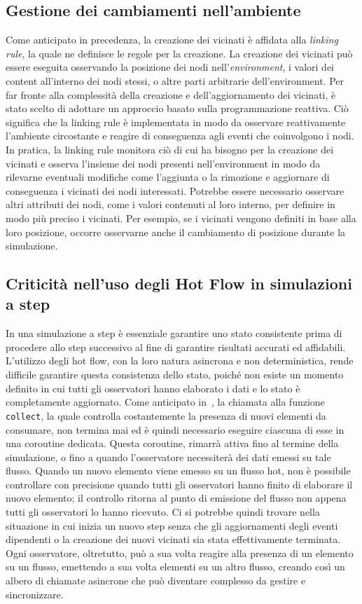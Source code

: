 \documentclass[12pt,a4paper,openright,twoside]{book}
\begin{document}
\subsection{Gestione dei cambiamenti nell'ambiente}
\label{sec:linking-rule}
Come anticipato in precedenza, la creazione dei vicinati è affidata alla \textit{linking rule}, la quale ne definisce le regole per la creazione. La creazione dei vicinati può essere eseguita osservando la posizione dei nodi nell'\textit{environment}, i valori dei content all'interno dei nodi stessi, o altre parti arbitrarie dell'environment. 
Per far fronte alla complessità della creazione e dell'aggiornamento dei vicinati, è stato scelto di adottare un approccio basato sulla programmazione reattiva. Ciò significa che la linking rule è implementata in modo da osservare reattivamente l'ambiente circostante e reagire di conseguenza agli eventi che coinvolgono i nodi.
In pratica, la linking rule monitora ciò di cui ha bisogno per la creazione dei vicinati e osserva l'insieme dei nodi presenti nell'environment in modo da rilevarne eventuali modifiche come l'aggiunta o la rimozione e aggiornare di conseguenza i vicinati dei nodi interessati. Potrebbe essere necessario osservare altri attributi dei nodi, come i valori contenuti al loro interno, per definire in modo più preciso i vicinati.
Per esempio, se i vicinati vengono definiti in base alla loro posizione, occorre osservarne anche il cambiamento di posizione durante la simulazione.

\subsection{Criticità nell'uso degli Hot Flow in simulazioni a step}
\label{sec:criticità-hot-flow}
In una simulazione a step è essenziale garantire uno stato consistente prima di procedere allo step successivo al fine di garantire risultati accurati ed affidabili. 
L'utilizzo degli hot flow, con la loro natura asincrona e non deterministica, rende difficile garantire questa consistenza dello stato, poiché non esiste un momento definito in cui tutti gli osservatori hanno elaborato i dati e lo stato è completamente aggiornato. 
Come anticipato in~, la chiamata alla funzione \texttt{collect}, la quale controlla costantemente la presenza di nuovi elementi da consumare, non termina mai ed è quindi necessario eseguire ciascuna di esse in una coroutine dedicata. Questa coroutine, rimarrà attiva fino al termine della simulazione, o fino a quando l'osservatore necessiterà dei dati emessi su tale flusso. 
Quando un nuovo elemento viene emesso su un flusso hot, non è possibile controllare con precisione quando tutti gli osservatori hanno finito di elaborare il nuovo elemento; il controllo ritorna al punto di emissione del flusso non appena tutti gli osservatori lo hanno ricevuto. Ci si potrebbe quindi trovare nella situazione in cui inizia un nuovo step senza che gli aggiornamenti degli eventi dipendenti o la creazione dei nuovi vicinati sia stata effettivamente terminata. 
Ogni osservatore, oltretutto, può a sua volta reagire alla presenza di un elemento su un flusso, emettendo a sua volta elementi su un altro flusso, creando così un albero di chiamate asincrone che può diventare complesso da gestire e sincronizzare. 
\end{document}
